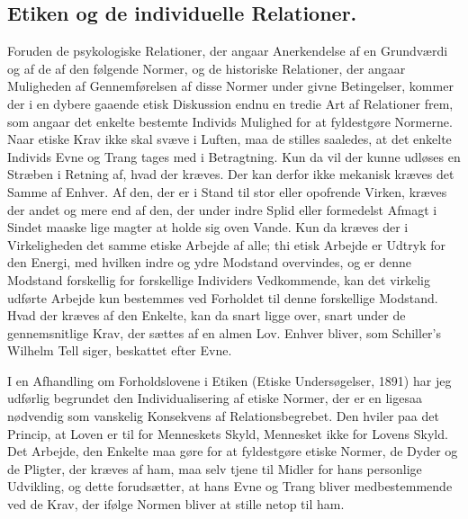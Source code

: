 \documentclass[12pt]{article}
\newcommand{\opage}[1]{\marginnote{\footnotesize\textit{[#1]}}}
\begin{document}
\subsection{Etiken og de individuelle Relationer.}\label{sec:4d}
\noindent
Foruden de psykologiske Relationer, der angaar Anerkendelse af en
Grundværdi og af de af den følgende Normer, og de historiske
Relationer, der angaar Muligheden af Gennemførelsen af disse Normer
under givne Betingelser, kommer der i en dybere gaaende etisk
Diskussion endnu en tredie Art af Relationer frem, som angaar det
enkelte bestemte Individs Mulighed for at fyldestgøre Normerne. Naar
etiske Krav ikke skal svæve i Luften, maa de stilles saaledes, at det
enkelte Individs Evne og Trang tages med i Betragtning. Kun da vil der
kunne udløses en Stræben i Retning af, hvad der kræves. Der kan derfor
ikke mekanisk kræves det Samme af Enhver. Af den, der er i Stand til
stor eller opofrende Virken, kræves der andet og mere end af den, der
under indre Splid eller formedelst Afmagt i Sindet maaske lige magter
at holde sig oven Vande. Kun da kræves der i Virkeligheden det samme
etiske Arbejde af alle; thi etisk Arbejde er Udtryk for den Energi,
med hvilken indre og ydre Modstand overvindes, og er denne Modstand
forskellig for forskellige Individers Vedkommende, kan det
\opage{91} virkelig udførte Arbejde kun bestemmes ved Forholdet til denne
forskellige Modstand. Hvad der kræves af den Enkelte, kan da snart
ligge over, snart under de gennemsnitlige Krav, der sættes af en almen
Lov. Enhver bliver, som Schiller's Wilhelm Tell siger, beskattet efter
Evne.

I en Afhandling om Forholdslovene i Etiken (Etiske Undersøgelser,
1891) har jeg udførlig begrundet den Individualisering af etiske
Normer, der er en ligesaa nødvendig som vanskelig Konsekvens af
Relationsbegrebet. Den hviler paa det Princip, at Loven er til for
Menneskets Skyld, Mennesket ikke for Lovens Skyld. Det Arbejde, den
Enkelte maa gøre for at fyldestgøre etiske Normer, de Dyder og de
Pligter, der kræves af ham, maa selv tjene til Midler for hans
personlige Udvikling, og dette forudsætter, at hans Evne og Trang
bliver medbestemmende ved de Krav, der ifølge Normen bliver at stille
netop til ham.
\end{document}
